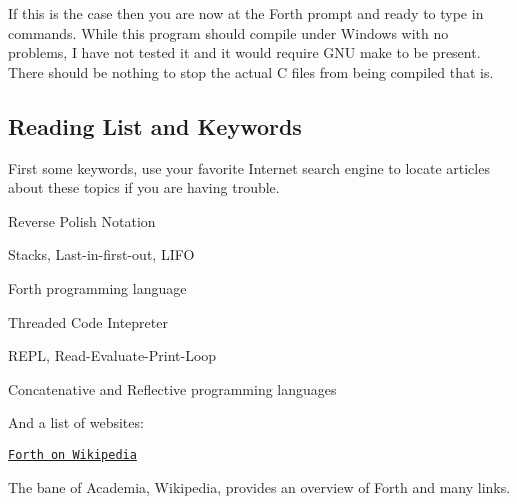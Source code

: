 If this is the case then you are now at the Forth prompt and ready to type in commands. While this program should compile under Windows with no problems, I have not tested it and it would require G\-N\-U make to be present. There should be nothing to stop the actual C files from being compiled that is.

\subsection*{Reading List and Keywords}

First some keywords, use your favorite Internet search engine to locate articles about these topics if you are having trouble.


\begin{DoxyItemize}
\item Reverse Polish Notation
\end{DoxyItemize}


\begin{DoxyItemize}
\item Stacks, Last-\/in-\/first-\/out, L\-I\-F\-O
\end{DoxyItemize}


\begin{DoxyItemize}
\item Forth programming language
\end{DoxyItemize}


\begin{DoxyItemize}
\item Threaded Code Intepreter
\end{DoxyItemize}


\begin{DoxyItemize}
\item R\-E\-P\-L, Read-\/\-Evaluate-\/\-Print-\/\-Loop
\end{DoxyItemize}


\begin{DoxyItemize}
\item Concatenative and Reflective programming languages
\end{DoxyItemize}

And a list of websites\-:


\begin{DoxyItemize}
\item \href{https://en.wikipedia.org/wiki/Forth_%28programming_language%29}{\tt Forth on Wikipedia}
\end{DoxyItemize}

The bane of Academia, Wikipedia, provides an overview of Forth and many links.


